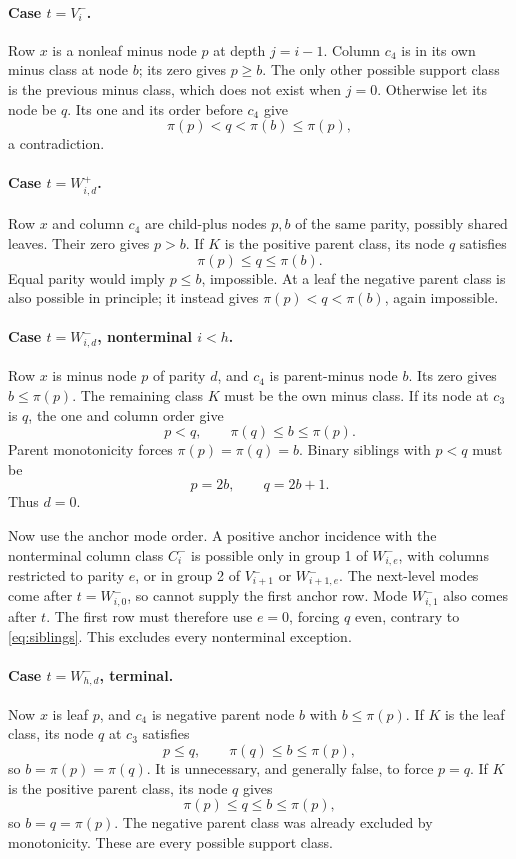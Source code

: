 \documentclass[11pt,a4paper]{article}
\theoremstyle{remark}
\begin{document}
\paragraph{Case \(t=V_i^-\).}
Row \(x\) is a nonleaf minus node \(p\) at depth \(j=i-1\).
Column \(c_4\) is in its own minus class at node \(b\); its zero
gives \(p\ge b\). The only other possible support class is the
previous minus class, which does not exist when \(j=0\).
Otherwise let its node be \(q\). Its one and its order before
\(c_4\) give
\[
\pi(p)<q<\pi(b)\le\pi(p),
\]
a contradiction.

\paragraph{Case \(t=W_{i,d}^+\).}
Row \(x\) and column \(c_4\) are child-plus nodes \(p,b\) of the
same parity, possibly shared leaves. Their zero gives \(p>b\).
If \(K\) is the positive parent class, its node \(q\) satisfies
\[
\pi(p)\le q\le\pi(b).
\]
Equal parity would imply \(p\le b\), impossible. At a leaf the
negative parent class is also possible in principle; it instead
gives \(\pi(p)<q<\pi(b)\), again impossible.

\paragraph{Case \(t=W_{i,d}^-\), nonterminal \(i<h\).}
Row \(x\) is minus node \(p\) of parity \(d\), and \(c_4\) is
parent-minus node \(b\). Its zero gives \(b\le\pi(p)\).
The remaining class \(K\) must be the own minus class. If its
node at \(c_3\) is \(q\), the one and column order give
\[
p<q,\qquad \pi(q)\le b\le\pi(p).
\]
Parent monotonicity forces \(\pi(p)=\pi(q)=b\). Binary siblings
with \(p<q\) must be
\begin{equation}\label{eq:siblings}
p=2b,\qquad q=2b+1.
\end{equation}
Thus \(d=0\).

Now use the anchor mode order. A positive anchor incidence with
the nonterminal column class \(C_i^-\) is possible only in group 1
of \(W_{i,e}^-\), with columns restricted to parity \(e\), or in
group 2 of \(V_{i+1}^-\) or \(W_{i+1,e}^-\). The next-level
modes come after \(t=W_{i,0}^-\), so cannot supply the first anchor
row. Mode \(W_{i,1}^-\) also comes after \(t\). The first row
must therefore use \(e=0\), forcing \(q\) even, contrary to
\eqref{eq:siblings}. This excludes every nonterminal exception.

\paragraph{Case \(t=W_{h,d}^-\), terminal.}
Now \(x\) is leaf \(p\), and \(c_4\) is negative parent node \(b\)
with \(b\le\pi(p)\). If \(K\) is the leaf class, its node \(q\)
at \(c_3\) satisfies
\[
p\le q,\qquad \pi(q)\le b\le\pi(p),
\]
so \(b=\pi(p)=\pi(q)\). It is unnecessary, and generally false,
to force \(p=q\). If \(K\) is the positive parent class, its node
\(q\) gives
\[
\pi(p)\le q\le b\le\pi(p),
\]
so \(b=q=\pi(p)\). The negative parent class was already excluded
by monotonicity. These are every possible support class.
\end{document}
